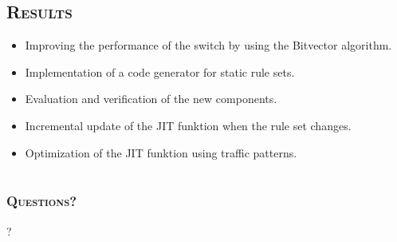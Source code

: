\documentclass[xcolor=x11names,compress]{beamer}
\renewcommand{\(}{\begin{columns}}
\renewcommand{\)}{\end{columns}}
\newcommand{\<}[1]{\begin{column}{#1}}
\renewcommand{\>}{\end{column}}
\begin{document}
\subsection{\scshape Results}
\begin{frame}
  \begin{tcolorbox}[colback=teal!5!white,colframe=teal!75!black,title=Important Results,drop fuzzy shadow]
    \begin{itemize}
      \item Improving the performance of the switch by using the Bitvector algorithm.
      \item Implementation of a code generator for static rule sets.
      \item Evaluation and verification of the new components.
    \end{itemize}
  \end{tcolorbox}
  \pause
  \begin{tcolorbox}[colback=blue!5!white,colframe=blue!75!black,title=Future Work,drop fuzzy shadow]
    \begin{itemize}
      \item Incremental update of the JIT funktion when the rule set changes.
      \item Optimization of the JIT funktion using traffic patterns.
    \end{itemize}
  \end{tcolorbox}
\end{frame}

\section{}
\begin{frame}
  \frametitle{\scshape Questions?}
  \centering\Huge{?}
\end{frame}

\appendix
\end{document}

